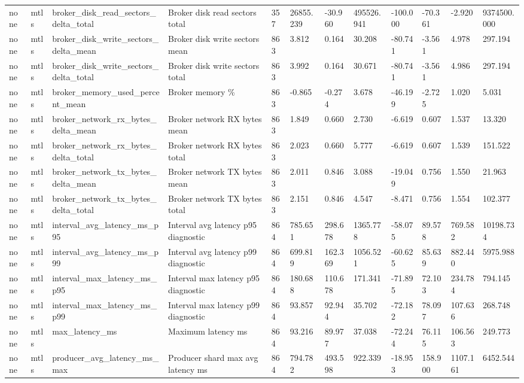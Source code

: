\begin{longtable}{llllllllllll}
none & mtls & broker\_disk\_read\_sectors\_delta\_total & Broker disk read sectors total & 357 & 26855.239 & -30.960 & 495526.941 & -100.000 & -70.361 & -2.920 & 9374500.000 \\
none & mtls & broker\_disk\_write\_sectors\_delta\_mean & Broker disk write sectors mean & 863 & 3.812 & 0.164 & 30.208 & -80.741 & -3.561 & 4.978 & 297.194 \\
none & mtls & broker\_disk\_write\_sectors\_delta\_total & Broker disk write sectors total & 863 & 3.992 & 0.164 & 30.671 & -80.741 & -3.561 & 4.986 & 297.194 \\
none & mtls & broker\_memory\_used\_percent\_mean & Broker memory \% & 863 & -0.865 & -0.274 & 3.678 & -46.199 & -2.725 & 1.020 & 5.031 \\
none & mtls & broker\_network\_rx\_bytes\_delta\_mean & Broker network RX bytes mean & 863 & 1.849 & 0.660 & 2.730 & -6.619 & 0.607 & 1.537 & 13.320 \\
none & mtls & broker\_network\_rx\_bytes\_delta\_total & Broker network RX bytes total & 863 & 2.023 & 0.660 & 5.777 & -6.619 & 0.607 & 1.539 & 151.522 \\
none & mtls & broker\_network\_tx\_bytes\_delta\_mean & Broker network TX bytes mean & 863 & 2.011 & 0.846 & 3.088 & -19.049 & 0.756 & 1.550 & 21.963 \\
none & mtls & broker\_network\_tx\_bytes\_delta\_total & Broker network TX bytes total & 863 & 2.151 & 0.846 & 4.547 & -8.471 & 0.756 & 1.554 & 102.377 \\
none & mtls & interval\_avg\_latency\_ms\_p95 & Interval avg latency p95 diagnostic & 864 & 785.651 & 298.678 & 1365.778 & -58.075 & 89.578 & 769.582 & 10198.734 \\
none & mtls & interval\_avg\_latency\_ms\_p99 & Interval avg latency p99 diagnostic & 864 & 699.819 & 162.369 & 1056.521 & -60.625 & 85.639 & 882.440 & 5975.988 \\
none & mtls & interval\_max\_latency\_ms\_p95 & Interval max latency p95 diagnostic & 864 & 180.688 & 110.678 & 171.341 & -71.895 & 72.103 & 234.784 & 794.145 \\
none & mtls & interval\_max\_latency\_ms\_p99 & Interval max latency p99 diagnostic & 864 & 93.857 & 92.944 & 35.702 & -72.182 & 78.097 & 107.636 & 268.748 \\
none & mtls & max\_latency\_ms & Maximum latency ms & 864 & 93.216 & 89.977 & 37.038 & -72.244 & 76.115 & 106.563 & 249.773 \\
none & mtls & producer\_avg\_latency\_ms\_max & Producer shard max avg latency ms & 864 & 794.782 & 493.598 & 922.339 & -18.953 & 158.900 & 1107.161 & 6452.544 \\

\end{longtable}
